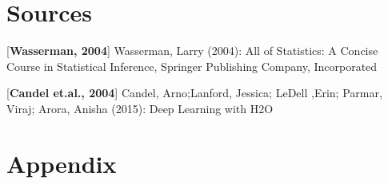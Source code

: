 \documentclass[fleqn]{article}
\begin{document}
\pagebreak
\section*{Sources}

[\textbf{Wasserman, 2004}]  Wasserman, Larry (2004): All of Statistics: A Concise Course in Statistical Inference, Springer Publishing Company, Incorporated

[\textbf{Candel et.al., 2004}] Candel, Arno;Lanford, Jessica; LeDell ,Erin; Parmar, Viraj; Arora, Anisha (2015): Deep Learning with H2O 

\pagebreak
\section*{Appendix}








\end{document}
